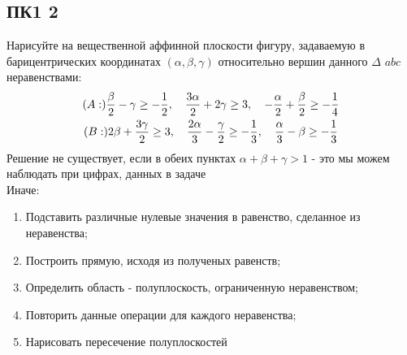 \begin{comment}
				\item Пусть вектор $a = (6 + 1, 19 - 5) = (7, 14)$, а вектор $b = (7 + 1, 22 - 5) = (8, 17)$. Тогда площадь треугольника, образованного этими векторами равна: \\ \\
				$2S = \left\| \begin{array}{cc}
				7 & 14 \\
				8 & 17
				\end{array} \right\| = | 119 -104 | = 15$, \\ \\
				откуда $S = 7,5$.
			\end{enumerate}
		\end{enumerate}
	\end{comment}
	
	\subsection{ПК1 2}
		Нарисуйте на вещественной аффинной плоскости фигуру, задаваемую в барицентрических координатах $(\alpha, \beta, \gamma)$ относительно вершин данного $\Delta$ $abc$ неравенствами:
		\begin{gather*}
			\text(A:) \frac{\beta}{2} - \gamma \ge - \frac{1}{2},\quad \frac{3 \alpha}{2} + 2 \gamma \ge 3,\quad - \frac{\alpha}{2} + \frac{\beta}{2} \ge - \frac{1}{4}\\
			\text(B:) 2 \beta + \frac{3 \gamma}{2} \ge 3,\quad \frac{2 \alpha}{3} - \frac{\gamma}{2} \ge - \frac{1}{3},\quad \frac{\alpha}{3} - \beta \ge - \frac{1}{3}
		\end{gather*}
		Решение не существует, если в обеих пунктах $\alpha + \beta + \gamma > 1$ - это мы можем наблюдать при цифрах, данных в задаче\\
		Иначе:
		\begin{enumerate}
			\item Подставить различные нулевые значения в равенство, сделанное из неравенства;
			\item Построить прямую, исходя из полученых равенств; 
			\item Определить область - полуплоскость, ограниченную неравенством; 
			\item Повторить данные операции для каждого неравенства; 
			\item Нарисовать пересечение полуплоскостей
		\end{enumerate}
		
